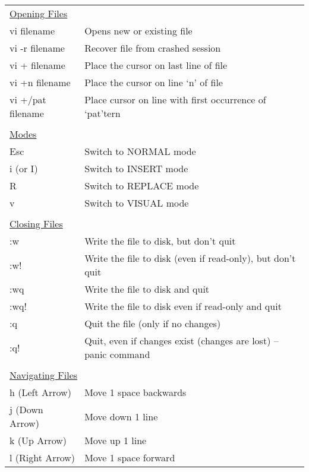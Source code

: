 \documentclass[11pt,a4paper,oneside]{article}
\begin{document}

\begin{table}
\begin{tabular}{p{4.5cm} l}
\multicolumn{2}{l}{\underline{Opening Files}} \\
vi filename & Opens new or existing file \\
vi -r filename & Recover file from crashed session \\
vi + filename & Place the cursor on last line of file \\
vi +n filename & Place the cursor on line `n' of file \\
vi +/pat filename & Place cursor on line with first occurrence of `pat'tern \\
 & \\[-1.5ex]
\multicolumn{2}{l}{\underline{Modes}} \\
 Esc & Switch to NORMAL mode \\
 i (or I) & Switch to INSERT mode \\
 R & Switch to REPLACE mode \\
 v & Switch to VISUAL mode \\
 & \\[-1.5ex]
\multicolumn{2}{l}{\underline{Closing Files}} \\
:w & Write the file to disk, but don't quit \\
:w! & Write the file to disk (even if read-only), but don't quit \\
:wq & Write the file to disk and quit \\
:wq! & Write the file to disk even if read-only and quit \\
:q & Quit the file (only if no changes) \\
:q! & Quit, even if changes exist (changes are lost) -- panic command \\
 & \\[-1.5ex]
\multicolumn{2}{l}{\underline{Navigating Files}} \\
h (Left Arrow) & Move 1 space backwards \\
j (Down Arrow) & Move down 1 line \\
k (Up Arrow) & Move up 1 line \\
l (Right Arrow) & Move 1 space forward \\

\end{tabular}
\end{table}
\end{document}
